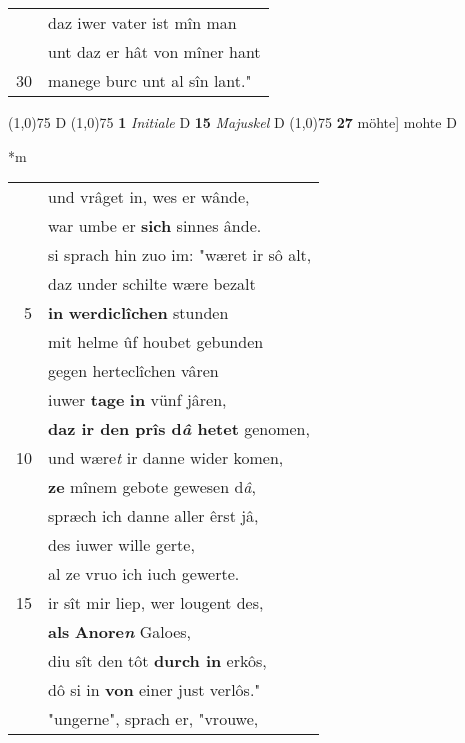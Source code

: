 \documentclass[8pt,a4paper,notitlepage]{article}
\begin{document}
\begin{table}[ht]
\begin{minipage}[t]{0.5\linewidth}
\begin{tabular}{rl}
 & daz iwer vater ist mîn man\\ 
 & unt daz er hât von mîner hant\\ 
30 & manege burc unt al sîn lant."\\ 
\end{tabular}
\scriptsize
\line(1,0){75} \newline
D \newline
\line(1,0){75} \newline
\textbf{1} \textit{Initiale} D  \textbf{15} \textit{Majuskel} D  \newline
\line(1,0){75} \newline
\textbf{27} möhte] mohte D \newline
\end{minipage}
\hspace{0.5cm}
\begin{minipage}[t]{0.5\linewidth}
\small
\begin{center}*m
\end{center}
\begin{tabular}{rl}
 & und vrâget in, wes er wânde,\\ 
 & war umbe er \textbf{sich} sinnes ânde.\\ 
 & si sprach hin zuo im: "wæret ir sô alt,\\ 
 & daz under schilte wære bezalt\\ 
5 & \textbf{in} \textbf{werdiclîchen} stunden\\ 
 & mit helme ûf houbet gebunden\\ 
 & gegen herteclîchen vâren\\ 
 & iuwer \textbf{tage} \textbf{in} vünf jâren,\\ 
 & \textbf{daz ir den prîs d\textit{â} hetet} genomen,\\ 
10 & und wære\textit{t} ir danne wider komen,\\ 
 & \textbf{ze} mînem gebote gewesen d\textit{â},\\ 
 & spræch ich danne aller êrst jâ,\\ 
 & des iuwer wille gerte,\\ 
 & al ze vruo ich iuch gewerte.\\ 
15 & ir sît mir liep, wer lougent des,\\ 
 & \textbf{als} \textbf{Anore\textit{n}} Galoes,\\ 
 & diu sît den tôt \textbf{durch in} erkôs,\\ 
 & dô si in \textbf{von} einer just verlôs."\\ 
 & "ungerne", sprach er, "vrouwe,\\ 

\end{tabular}
\end{minipage}
\end{table}
\end{document}
